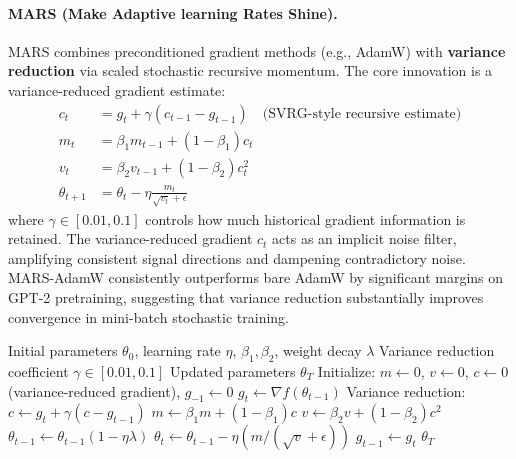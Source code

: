 \documentclass[11pt,a4paper]{article}
\begin{document}
\paragraph{MARS (Make Adaptive learning Rates Shine).}
MARS combines preconditioned gradient methods (e.g., AdamW) with \textbf{variance reduction} via scaled stochastic recursive momentum. The core innovation is a variance-reduced gradient estimate:
\begin{align}
c_t &= g_t + \gamma(c_{t-1} - g_{t-1}) \quad\text{(SVRG-style recursive estimate)} \\
m_t &= \beta_1 m_{t-1} + (1-\beta_1)c_t \\
v_t &= \beta_2 v_{t-1} + (1-\beta_2)c_t^2 \\
\theta_{t+1} &= \theta_t - \eta\frac{m_t}{\sqrt{v_t}+\epsilon}
\end{align}
where $\gamma \in [0.01, 0.1]$ controls how much historical gradient information is retained. The variance-reduced gradient $c_t$ acts as an implicit noise filter, amplifying consistent signal directions and dampening contradictory noise. MARS-AdamW consistently outperforms bare AdamW by significant margins on GPT-2 pretraining, suggesting that variance reduction substantially improves convergence in mini-batch stochastic training.

\begin{algorithm}[H]
\caption{MARS (Make Adaptive learning Rates Shine)}
\label{alg:mars}
\begin{algorithmic}[1]
\Require Initial parameters $\theta_0$, learning rate $\eta$, $\beta_1, \beta_2$, weight decay $\lambda$
\Require Variance reduction coefficient $\gamma \in [0.01, 0.1]$
\Ensure Updated parameters $\theta_T$
\State Initialize: $m \gets 0$, $v \gets 0$, $c \gets 0$ (variance-reduced gradient), $g_{-1} \gets 0$
    \State $g_t \gets \nabla f(\theta_{t-1})$
    \State Variance reduction: $c \gets g_t + \gamma(c - g_{t-1})$
    \State $m \gets \beta_1 m + (1-\beta_1) c$
    \State $v \gets \beta_2 v + (1-\beta_2) c^2$
        \State $\theta_{t-1} \gets \theta_{t-1}(1 - \eta\lambda)$
    \EndIf
    \State $\theta_t \gets \theta_{t-1} - \eta (m / (\sqrt{v} + \epsilon))$
    \State $g_{t-1} \gets g_t$
\EndFor
\Return $\theta_T$
\end{algorithmic}
\end{algorithm}
\end{document}
